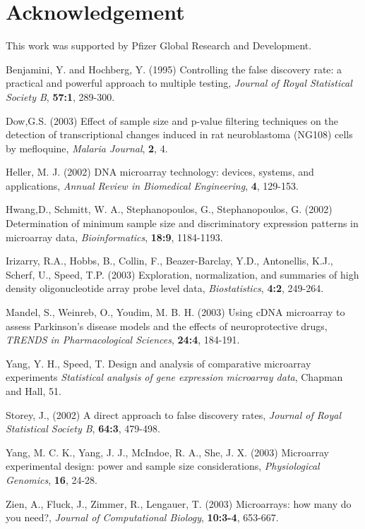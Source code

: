 \documentclass{bioinfo}
\begin{document}
\section*{Acknowledgement}

This work was supported by Pfizer Global Research and Development.

\begin{thebibliography}{}

 Benjamini, Y. and Hochberg, Y. (1995)
  Controlling the false discovery rate: a practical and powerful
  approach to multiple testing, {\it Journal of Royal Statistical
    Society B}, {\bf 57:1}, 289-300.

 Dow,G.S. (2003) Effect of sample size and p-value filtering techniques on the detection of transcriptional changes induced in
  rat neuroblastoma (NG108) cells by mefloquine, {\it Malaria Journal}, {\bf 2}, 4.

 Heller, M. J. (2002) {DNA microarray technology: devices, systems, and applications},
  {\it Annual Review in Biomedical Engineering}, {\bf 4}, 129-153.

 Hwang,D., Schmitt, W. A., Stephanopoulos, G., Stephanopoulos, G. (2002)
  Determination of minimum sample size and discriminatory expression patterns in microarray data,
  {\it Bioinformatics}, {\bf 18:9}, 1184-1193.

 Irizarry, R.A., Hobbs, B., Collin, F., Beazer-Barclay, Y.D., Antonellis, K.J.,
  Scherf, U., Speed, T.P. (2003)
   Exploration, normalization, and summaries of high density oligonucleotide array probe level data,
  {\it Biostatistics}, {\bf 4:2}, 249-264.

 Mandel, S.,  Weinreb, O., Youdim, M. B. H. (2003)
  Using cDNA microarray to assess Parkinson's disease models and
  the effects of neuroprotective drugs, {\it TRENDS in Pharmacological Sciences}, {\bf 24:4}, 184-191.

 Yang, Y. H., Speed, T. {Design and analysis of comparative microarray experiments
  \it Statistical analysis of gene expression microarray data},  {Chapman and Hall}, 51.

 Storey, J., (2002)
  A direct approach to false discovery rates, {\it Journal of Royal Statistical Society B}, {\bf 64:3}, 479-498.

 Yang, M. C. K., Yang, J. J., McIndoe, R. A., She, J. X. (2003)
  Microarray experimental design: power and sample size considerations, {\it Physiological Genomics}, {\bf 16}, 24-28.

 Zien, A., Fluck, J., Zimmer, R., Lengauer, T. (2003)
  Microarrays: how many do you need?, {\it Journal of Computational Biology}, {\bf 10:3-4}, 653-667.
\end{thebibliography}
\end{document}
